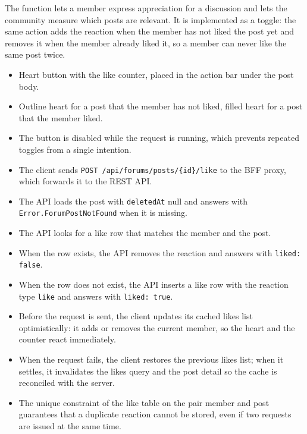 \noindent The function lets a member express appreciation for a discussion and lets the community
measure which posts are relevant. It is implemented as a toggle: the same action adds the
reaction when the member has not liked the post yet and removes it when the member already liked
it, so a member can never like the same post twice.

\begin{itemize}[leftmargin=1.6em,topsep=3pt,itemsep=2pt,parsep=0pt,label=$\bullet$]
      \item Heart button with the like counter, placed in the action bar under the post
            body.
      \item Outline heart for a post that the member has not liked, filled heart for a post
            that the member liked.
      \item The button is disabled while the request is running, which prevents repeated
            toggles from a single intention.
\end{itemize}

\begin{itemize}[leftmargin=1.6em,topsep=3pt,itemsep=2pt,parsep=0pt,label=$\bullet$]
      \item The client sends \texttt{POST /api/forums/posts/\{id\}/like} to the BFF proxy,
            which forwards it to the REST API.
      \item The API loads the post with \texttt{deletedAt} null and answers with
            \texttt{Error.ForumPostNotFound} when it is missing.
      \item The API looks for a like row that matches the member and the post.
      \item When the row exists, the API removes the reaction and answers with
            \texttt{liked: false}.
      \item When the row does not exist, the API inserts a like row with the reaction type
            \texttt{like} and answers with \texttt{liked: true}.
      \item Before the request is sent, the client updates its cached likes list
            optimistically: it adds or removes the current member, so the heart and the
            counter react immediately.
      \item When the request fails, the client restores the previous likes list; when it
            settles, it invalidates the likes query and the post detail so the cache is
            reconciled with the server.
      \item The unique constraint of the like table on the pair member and post guarantees
            that a duplicate reaction cannot be stored, even if two requests are issued at
            the same time.
\end{itemize}

